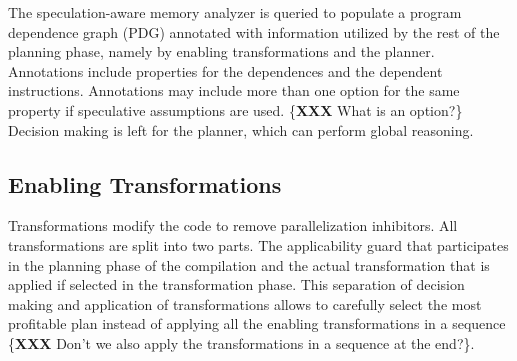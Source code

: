 
The speculation-aware memory analyzer is queried to populate a program
dependence graph (PDG) annotated with information utilized by the rest
of the planning phase, namely by enabling transformations and the
planner. Annotations include properties for the dependences and the
dependent instructions.
Annotations may include more than one option for the same property if
speculative assumptions are used. \{\textbf{XXX} What is an option?\}
%
Decision making is left for the planner, which can perform global
reasoning.


\subsection{Enabling Transformations}
\label{enablers}

Transformations modify the code to remove parallelization inhibitors.
%
All transformations are split into two parts. The applicability guard
that participates in the planning phase of the compilation and the
actual transformation that is applied if selected in the
transformation phase.
This separation of decision making and application of transformations
allows \name to carefully select the most profitable plan instead of
applying all the enabling transformations in a sequence \{\textbf{XXX}
Don't we also apply the transformations in a sequence at the end?\}.

